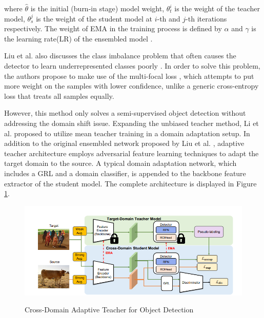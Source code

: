 \documentclass[english, 12pt, a4paper, elec, utf8, a-1b, online]{aaltothesis}
\begin{document}
where $\hat{\theta}$ is the initial (burn-in stage) model weight, $\theta_{t}^{i}$ is the weight of the teacher model, $\theta_{s}^{j}$ is the weight of the student model  at $i$-th and $j$-th iterations respectively. The weight of EMA in the training process is defined by $\alpha$ and $\gamma$ is the learning rate(LR) of the ensembled model \cite{Liu2021}.

Liu et al. also discusses the class imbalance problem that often causes the detector to learn underrepresented classes poorly \cite{Liu2021}. In order to solve this problem, the authors propose to make use of the multi-focal loss \cite{Lin2017}, which attempts to put more weight on the samples with lower confidence, unlike a generic cross-entropy loss that treats all samples equally. 

However, this method only solves a semi-supervised object detection without addressing the domain shift issue. Expanding the unbiased teacher method, Li et al.\cite{Li2021} proposed to utilize mean teacher training in a domain adaptation setup. In addition to the original ensembled network proposed by Liu et al. \cite{Liu2021}, adaptive teacher architecture employs adversarial feature learning techniques to adapt the target domain to the source. A typical domain adaptation network, which includes a GRL and a domain classifier, is appended to the backbone feature extractor of the student model. The complete architecture is displayed in Figure \ref{adapt_teacher}. 
 
\begin{figure}[htb]
	\begin{center}
		\includegraphics[width=16cm]{./adapt_teacher.png}
	\end{center}
	\caption{Cross-Domain Adaptive Teacher for Object Detection
\cite{Li2021}}
	\begin{center}
		\label{adapt_teacher}
	\end{center}
\end{figure}
\FloatBarrier
\end{document}
